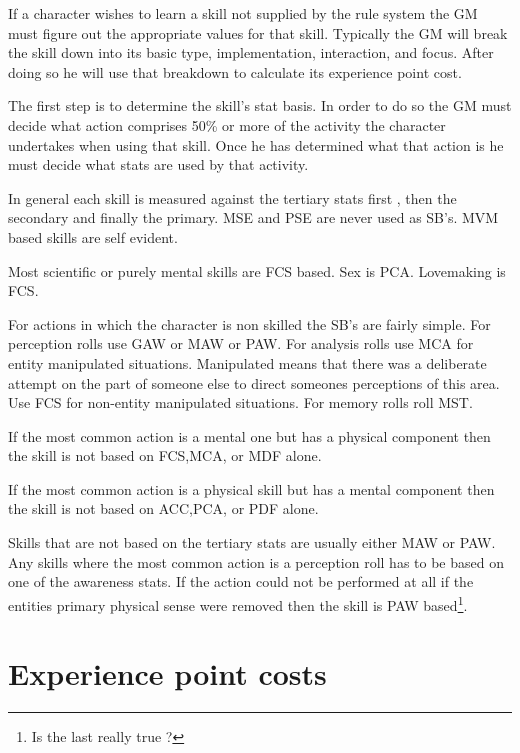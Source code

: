 \normalsize

If a character wishes to learn a skill not supplied by the rule
system the GM must figure out the appropriate values for that skill.
Typically the GM will break the skill down into its basic type,
implementation, interaction, and focus. After doing so he will use
that breakdown to calculate its experience point cost.

The first step is to determine the skill's stat basis. In order to do
so the GM must decide what action comprises 50\% or more of the activity
the character undertakes when using that skill. Once he has determined
what that action is he must decide what stats are used by that activity.

In general each skill is measured against the tertiary stats first , then the
secondary and finally the primary. MSE and PSE are never used as SB's.
MVM based skills are self evident.

Most scientific or purely mental skills are FCS based.
Sex is PCA. Lovemaking is FCS.

For actions in which the character is non skilled the SB's are fairly
simple. For perception rolls use GAW or MAW or PAW. For analysis rolls
use MCA for entity manipulated situations. Manipulated means that there
was a deliberate attempt on the part of someone else to direct someones
perceptions of this area. Use FCS for non-entity manipulated
situations. For memory rolls roll MST.

If the most common action is a mental one but has a physical component then
the skill is not based on FCS,MCA, or MDF alone.

If the most common action is a physical skill but has a mental component then the
skill is not based on ACC,PCA, or PDF alone.

Skills that are not based on the tertiary stats are usually either MAW
or PAW. Any skills where the most common action is a perception roll has
to be based on one of the awareness stats. If the action could not be
performed at all if the entities primary physical sense were removed
then the skill is PAW based\footnote{Is the last really true ?}.



\section{Experience point costs}



